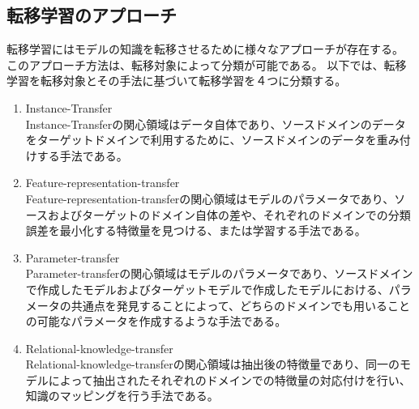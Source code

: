     \begin{table}[ht]
    \caption{Classification of Transfer Learning Settings and Related Domains\cite{pan2009survey}.}
    \label{ClassificationOfTL}
    \end{table}

\subsection{転移学習のアプローチ}
    転移学習にはモデルの知識を転移させるために様々なアプローチが存在する。
    このアプローチ方法は、転移対象によって分類が可能である。
    以下では、転移学習を転移対象とその手法に基づいて転移学習を４つに分類する。
    \begin{enumerate}
        \item Instance-Transfer\\
            Instance-Transferの関心領域はデータ自体であり、ソースドメインのデータをターゲットドメインで利用するために、ソースドメインのデータを重み付けする手法である。
        \item Feature-representation-transfer\\
            Feature-representation-transferの関心領域はモデルのパラメータであり、ソースおよびターゲットのドメイン自体の差や、それぞれのドメインでの分類誤差を最小化する特徴量を見つける、または学習する手法である。
        \item Parameter-transfer\\
            Parameter-transferの関心領域はモデルのパラメータであり、ソースドメインで作成したモデルおよびターゲットモデルで作成したモデルにおける、パラメータの共通点を発見することによって、どちらのドメインでも用いることの可能なパラメータを作成するような手法である。
        \item Relational-knowledge-transfer\\
            Relational-knowledge-transferの関心領域は抽出後の特徴量であり、同一のモデルによって抽出されたそれぞれのドメインでの特徴量の対応付けを行い、知識のマッピングを行う手法である。
    \end{enumerate}

